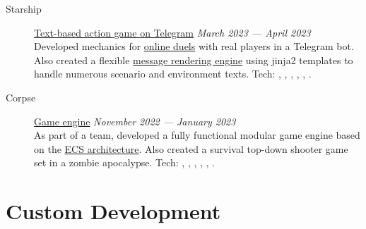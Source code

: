 \documentclass[margin,line]{resume}
\begin{document}
\begin{resume}
\begin{description}
    \item[Starship]\small{\href{https://github.com/starship-crew}{Text-based action game on Telegram} \hfill
      \textsl{March 2023 — April 2023\vspace{1mm}}}\\
      Developed mechanics for
      \href{https://github.com/starship-crew/telegram-client/blob/main/app/handlers/fight.py}{online duels}
      with real players in a Telegram bot. Also created a flexible
      \href{https://github.com/starship-crew/telegram-client/blob/main/app/template.py}{message rendering engine}
      using jinja2 templates to handle numerous scenario and environment texts.
      Tech: , ,
      ,
      , ,
      .
      \vspace{3mm}

    \item[Corpse]\small{\href{https://github.com/corpse-inc/corpse}{Game engine} \hfill
      \textsl{November 2022 — January 2023\vspace{1mm}}}\\
      As part of a team, developed a fully functional modular game engine
      based on the \href{https://en.wikipedia.org/wiki/Entity_component_system#:~:text=Entity%E2%80%93component%E2%80%93system%20(ECS,Entity%E2%80%93Component%E2%80%93System%20layout.}{ECS architecture}.
      Also created a survival top-down shooter game set in a zombie apocalypse.
      Tech: , ,
      , , ,
      .

    \end{description}

    \section{\mysidestyle Custom Development}\vspace{2mm}


\end{resume}
\end{document}
